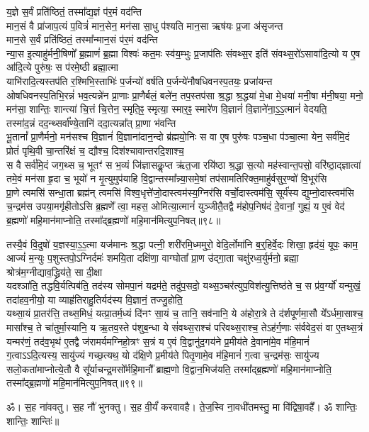 य॒ज्ञे स॒र्वं प्रति॑ष्ठितं॒ तस्मा᳚द्य॒ज्ञं प॑र॒मं वद॑न्ति\\
मान॒सं वै प्रा॑जाप॒त्यं प॒वित्रं॑ मान॒सेन॒ मन॑सा सा॒धु प॑श्यति मान॒सा ऋष॑यः प्र॒जा अ॑सृजन्त\\
मान॒से स॒र्वं प्रति॑ष्ठितं॒ तस्मा᳚न्मान॒सं प॑र॒मं वद॑न्ति\\
न्या॒स इ॒त्याहु॑र्मनी॒षिणो᳚ ब्र॒ह्माणं॑ ब्र॒ह्मा विश्वः॑ कत॒मः स्व॑य॒म्भुः प्र॒जाप॑तिः संवथ्स॒र इति॑ संवथ्स॒रो॑ऽसावा॑दि॒त्यो य ए॒ष आ॑दि॒त्ये पुरु॑षः॒ स प॑रमे॒ष्ठी ब्रह्मा॒त्मा\\
याभि॑रादि॒त्यस्तप॑ति र॒श्मिभि॒स्ताभिः॑ प॒र्जन्यो॑ वर्\mbox{}षति प॒र्जन्ये॑नौषधिवनस्प॒तयः॒ प्रजा॑यन्त\\
ओषधिवनस्प॒तिभि॒रन्नं॑ भव॒त्यन्ने॑न प्रा॒णाः
प्रा॒णैर्बलं॒ बले॑न॒ तप॒स्तप॑सा श्र॒द्धा श्र॒द्धया॑ मे॒धा मे॒धया॑ मनी॒षा म॑नी॒षया॒ मनो॒ मन॑सा॒ शान्तिः॒ शान्त्या॑ चि॒त्तं चि॒त्तेन॒ स्मृति॒ꣴ॒ स्मृत्या॒ स्मार॒ꣴ॒ स्मारे॑ण वि॒ज्ञानं॑  वि॒ज्ञाने॑ना॒ऽ॒ऽ॒त्मानं॑ वेदयति॒\\
तस्मा॑द॒न्नं दद॒न्थ्सर्वा᳚ण्ये॒तानि॑ ददा॒त्यन्ना᳚त् प्रा॒णा भ॑वन्ति\\
भू॒तानां᳚ प्रा॒णैर्मनो॒ मन॑सश्च वि॒ज्ञानं॑  वि॒ज्ञाना॑दान॒न्दो ब्र॑ह्मयो॒निः स वा ए॒ष पुरु॑षः पञ्च॒धा प॑ञ्चा॒त्मा येन॒ सर्व॑मि॒दं प्रोतं॑ पृथि॒वी चा॒न्तरि॑क्षं च॒ द्यौश्च॒ दिश॑श्चावान्तरदि॒शाश्च॒\\
स वै सर्व॑मि॒दं जग॒थ्स च॒ भूतꣳ॑ स भ॒व्यं जि॑ज्ञासकॢ॒प्त ऋ॑त॒जा रयि॑ष्ठा श्र॒द्धा स॒त्यो मह॑स्वान्त॒पसो॒ वरि॑ष्ठा॒द्ज्ञात्वा॑ तमे॒वं मन॑सा हृ॒दा च॒ भूयो॑ न मृ॒त्युमुप॑याहि वि॒द्वान्तस्मा᳚न्न्या॒समे॒षां तप॑सामतिरिक्त॒माहु॑र्वसुर॒ण्वो॑ वि॒भूर॑सि\\
प्रा॒णे त्वमसि॑ सन्धा॒ता ब्रह्म॑न् त्वमसि॑ विश्व॒धृत्ते॑जो॒दास्त्वम॑स्य॒ग्निर॑सि वर्चो॒दास्त्वम॑सि॒ सूर्य॑स्य द्युम्नो॒दास्त्वम॑सि च॒न्द्रम॑स उपया॒मगृ॑हीतो\-ऽसि ब्र॒ह्मणे᳚ त्वा॒ महस॒ ओमित्या॒त्मानं॑ युञ्जीतै॒तद्वै म॑होप॒निष॑दं दे॒वानां॒ गुह्यं॒ य ए॒वं वेद॑ ब्र॒ह्मणो॑ महि॒मान॑माप्नोति॒ तस्मा᳚द्ब्र॒ह्मणो॑ महि॒मान॑मित्युप॒निषत्॥९८॥\anuvakamend



तस्यै॒वं  वि॒दुषो॑ य॒ज्ञस्या॒ऽ॒ऽ॒त्मा यज॑मानः श्र॒द्धा पत्नी॒ शरी॑रमि॒ध्ममुरो॒ वेदि॒र्लोमा॑नि ब॒र्॒‌हिर्वे॒दः शिखा॒ हृद॑यं॒ यूपः॒ काम॒ आज्यं॑ म॒न्युः प॒शुस्तपो॒ऽग्निर्दमः॑ शमयि॒ता दक्षि॑णा॒ वाग्घोता᳚ प्रा॒ण उ॑द्गा॒ता चक्षु॑रध्व॒र्युर्मनो॒ ब्रह्मा॒ 
श्रोत्र॑म॒ग्नीद्याव॒द्ध्रिय॑ते॒ सा दी॒क्षा\\
यदश्ञा॑ति॒ तद्धवि॒र्यत्पिब॑ति॒ तद॑स्य सोमपा॒नं यद्रम॑ते॒ तदु॑प॒सदो॒ यथ्स॒ञ्चर॑त्युप॒विश॑त्यु॒त्तिष्ठ॑ते च॒ स प्र॑व॒र्ग्यो॑ यन्मुखं॒ तदा॑हव॒नीयो॒ या व्याहृ॑तिराहु॒तिर्यद॑स्य 
वि॒ज्ञानं॒ तज्जु॒होति॒\\
यथ्सा॒यं प्रा॒तर॑त्ति॒ तथ्स॒मिधं॒ यत्प्रा॒तर्म॒ध्यं दि॑नꣳ सा॒यं  च॒ तानि॒ सव॑नानि॒ ये अ॑होरा॒त्रे ते द॑र्\mbox{}शपूर्णमा॒सौ ये᳚ऽर्धमा॒साश्च॒ मासा᳚श्च॒ ते चा॑तुर्मा॒स्यानि॒ य ऋ॒तव॒स्ते प॑शुब॒न्धा ये सं॑वथ्स॒राश्च॑ परिवथ्स॒राश्च॒ तेऽह॑र्ग॒णाः स॑र्ववेद॒सं वा 
ए॒तथ्स॒त्रं यन्मर॑णं॒ तद॑व॒भृथ॑ ए॒तद्वै ज॑रामर्यमग्निहो॒त्रꣳ स॒त्रं य ए॒वं  वि॒द्वानु॑द॒गय॑ने प्र॒मीय॑ते दे॒वाना॑मे॒व म॑हि॒मानं॑ ग॒त्वाऽऽदि॒त्यस्य॒ सायु॑ज्यं गच्छ॒त्यथ॒
यो द॑क्षि॒णे प्र॒मीय॑ते पितृ॒णामे॒व म॑हि॒मानं॑ ग॒त्वा च॒न्द्रम॑सः॒ सायु॑ज्य सलो॒कता॑माप्नोत्ये॒तौ वै सू᳚र्याचन्द्र॒मसो᳚र्महि॒मानौ᳚ ब्राह्म॒णो वि॒द्वान॒भिज॑यति॒ तस्मा᳚द्ब्र॒ह्मणो॑ महि॒मान॑माप्नोति॒ तस्मा᳚द्ब्र॒ह्मणो॑ महि॒मान॑मित्युप॒निषत्॥९९॥
\anuvakamend

ॐ। स॒ह ना॑ववतु। 
स॒ह नौ॑ भुनक्तु। 
स॒ह वी॒र्यं॑ करवावहै। 
ते॒ज॒स्वि ना॒वधी॑तमस्तु॒ मा वि॑द्विषा॒वहै᳚। 
ॐ शान्तिः॒ शान्तिः॒ शान्तिः॑॥

